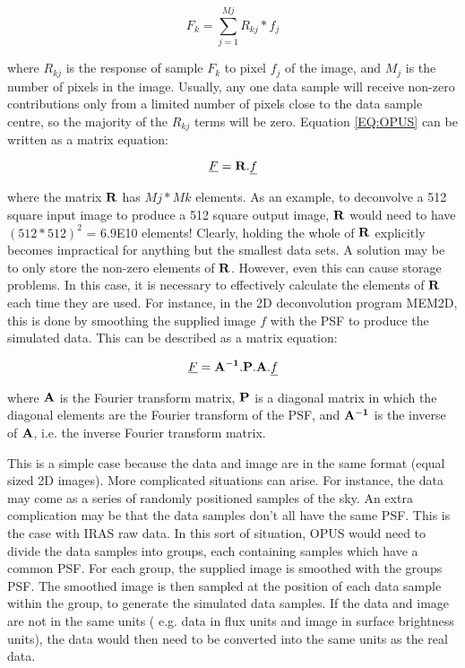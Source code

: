 \begin {equation}
F_{k}=\sum_{j=1}^{Mj} R_{kj}*f_{j}        \label {EQ:OPUS}
\end {equation}

where $R_{kj}$ is the response of sample $F_{k}$ to pixel $f_{j}$ of the 
image, and $M_{j}$ is the number of pixels in the image.
Usually, any one data sample will receive non-zero contributions only 
from a limited number of pixels close to the data sample centre, so the 
majority of the $R_{kj}$ terms will be zero. Equation \ref{EQ:OPUS} can be 
written as a matrix equation:

\begin {equation}
\underline{F}={\bf R}.\underline{f}		  \label {EQ:MATRIX_OPUS}
\end {equation}

where the matrix ${\bf R}$ has $Mj*Mk$ elements. As an example, to deconvolve a
512 square input image  to produce a 512 square output image, ${\bf R}$ would
need to have $(512*512)^{2}$ = 6.9E10  elements! Clearly, holding the whole of
${\bf R}$ explicitly becomes  impractical for anything but the smallest data
sets. A solution may be to only store the non-zero elements of ${\bf R}$.
However, even this can cause  storage problems. In this case, it is necessary
to effectively calculate the  elements of ${\bf R}$ each time they are used.
For instance, in the 2D  deconvolution program MEM2D, this is done by smoothing
the supplied image $f$ with  the PSF to produce the simulated data. This can be
described as a matrix  equation:

\begin {equation}
\underline{F}={\bf A^{-1}}.{\bf P}.{\bf A}.\underline{f} \label {EQ:MEM2D_OPUS}
\end {equation}

where ${\bf A}$ is the Fourier transform matrix, ${\bf P}$ is a diagonal matrix
in which the diagonal elements are the Fourier transform of the PSF, and ${\bf
A^{-1}}$ is  the inverse of ${\bf A}$, i.e. the inverse Fourier transform
matrix.

This is a simple case because the data  and image are in the same format (equal
sized 2D images). More complicated  situations can arise. For instance, the
data may come as a series of randomly  positioned samples of the sky. An extra 
complication may be that the data samples don't all have the same PSF. This is 
the case with IRAS raw data. In this sort of situation, OPUS would need to 
divide the data samples into groups, each containing samples which have a
common PSF.  For each group, the supplied image is smoothed with the groups
PSF. The smoothed  image is then sampled at the position of each data sample
within the group, to  generate the simulated data samples. If the data and
image are not in the same  units ( e.g. data in flux units and image in surface
brightness units), the data would then need to be converted into the same units
as the real data.


